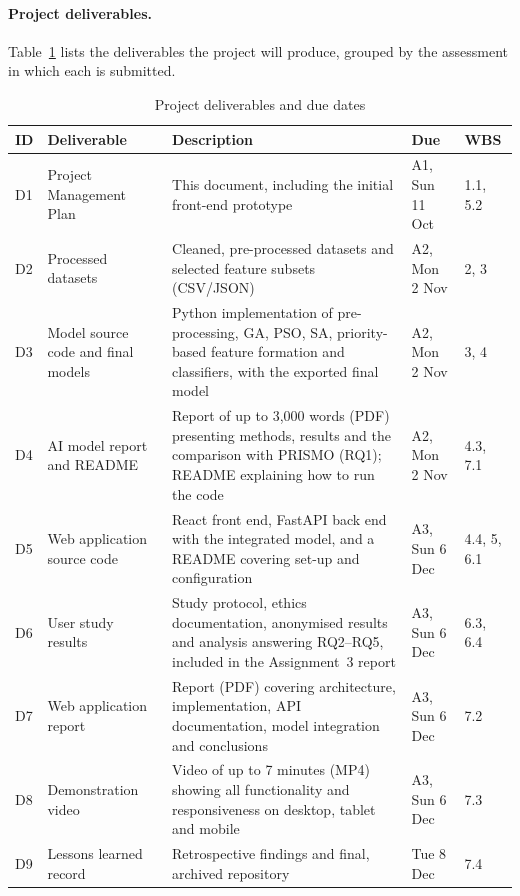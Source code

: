 \paragraph{Project deliverables.} Table~\ref{tab:deliverables} lists the deliverables the project will produce, grouped by the assessment in which each is submitted.

\begin{table}[htbp]
\centering
\caption{Project deliverables and due dates}
\label{tab:deliverables}
\begin{tabularx}{\textwidth}{@{}l >{\raggedright\arraybackslash}p{} >{\raggedright\arraybackslash}X >{\raggedright\arraybackslash}p{} l@{}}
  \toprule
  \textbf{ID} & \textbf{Deliverable} & \textbf{Description} & \textbf{Due} & \textbf{WBS} \\
  \midrule
  D1 & Project Management Plan & This document, including the initial front-end prototype & A1, Sun 11 Oct & 1.1, 5.2 \\
  \midrule
  D2 & Processed datasets & Cleaned, pre-processed datasets and selected feature subsets (CSV/JSON) & A2, Mon 2 Nov & 2, 3 \\
  D3 & Model source code and final models & Python implementation of pre-processing, GA, PSO, SA, priority-based feature formation and classifiers, with the exported final model & A2, Mon 2 Nov & 3, 4 \\
  D4 & AI model report and README & Report of up to 3,000 words (PDF) presenting methods, results and the comparison with PRISMO (RQ1); README explaining how to run the code & A2, Mon 2 Nov & 4.3, 7.1 \\
  \midrule
  D5 & Web application source code & React front end, FastAPI back end with the integrated model, and a README covering set-up and configuration & A3, Sun 6 Dec & 4.4, 5, 6.1 \\
  D6 & User study results & Study protocol, ethics documentation, anonymised results and analysis answering RQ2--RQ5, included in the Assignment~3 report & A3, Sun 6 Dec & 6.3, 6.4 \\
  D7 & Web application report & Report (PDF) covering architecture, implementation, API documentation, model integration and conclusions & A3, Sun 6 Dec & 7.2 \\
  D8 & Demonstration video & Video of up to 7 minutes (MP4) showing all functionality and responsiveness on desktop, tablet and mobile & A3, Sun 6 Dec & 7.3 \\
  \midrule
  D9 & Lessons learned record & Retrospective findings and final, archived repository & Tue 8 Dec & 7.4 \\
  \bottomrule
\end{tabularx}
\end{table}

